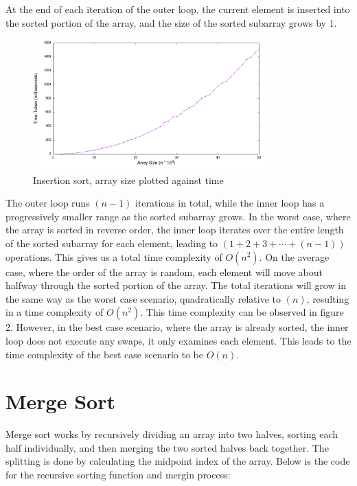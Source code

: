 \documentclass[a4paper,11pt]{article}
\begin{document}
At the end of each iteration of the outer loop, the current element is inserted into the sorted portion of the array,
and the size of the sorted subarray grows by 1.

\begin{figure}[h!]
  \centering
  \includegraphics[width=0.8\textwidth]{InsertionSort_plot}
  \caption{Insertion sort, array size plotted against time}
  \label{fig:InsertionSort_plot}
\end{figure}

The outer loop runs $(n - 1)$ iterations in total, while the inner loop has a progressively smaller range
as the sorted subarray grows.
In the worst case, where the array is sorted in reverse order,
the inner loop iterates over the entire length of the sorted subarray for each element,
leading to $(1 + 2 + 3 + \cdots + (n - 1))$ operations.
This gives us a total time complexity of $O(n^2)$.
On the average case, where the order of the array is random, each element will move about halfway through the sorted portion of the array.
The total iterations will grow in the same way as the worst case scenario, quadratically relative to $(n)$,
resulting in a time complexity of $O(n^2)$.
This time complexity can be observed in figure 2.
However, in the best case scenario, where the array is already sorted, the inner loop does not execute any swaps,
it only examines each element.
This leads to the time complexity of the best case scenario to be $O(n)$.

\section*{Merge Sort}

Merge sort works by recursively dividing an array into two halves, sorting each half individually,
and then merging the two sorted halves back together.
The splitting is done by calculating the midpoint index of the array.
Below is the code for the recursive sorting function and mergin process:
\end{document}
